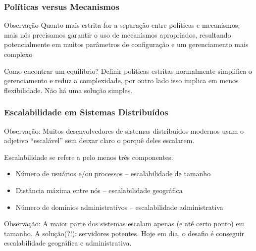 \documentclass[Ligatures=TeX,table,brazil,svgnames,usetotalslideindicator,compress,10pt]{beamer}
\begin{document}
\begin{frame}
  \frametitle{Políticas versus Mecanismos}
  \begin{block}{Observação}
    Quanto mais estrita for a separação entre políticas e mecanismos, mais nós precisamos garantir o uso de mecanismos apropriados, resultando potencialmente em muitos parâmetros de configuração e um gerenciamento mais complexo
  \end{block}
  \begin{block}{Como encontrar um equilíbrio?}
    Definir políticas estritas normalmente simplifica o gerenciamento e reduz a complexidade, por outro lado isso implica em menos flexibilidade. Não há uma solução simples.
  \end{block}
\end{frame}

\begin{frame}
  \frametitle{Escalabilidade em Sistemas Distribuídos}

  \begin{block}{Observação:}
    Muitos desenvolvedores de sistemas distribuídos modernos usam o adjetivo ``escalável'' sem deixar claro o \alert{porquê} deles escalarem.
  \end{block}

  \pause

  \begin{block}{Escalabilidade se refere a pelo menos três componentes:}
    \begin{itemize}
    \item Número de usuários e/ou processos -- \alert{escalabilidade de tamanho}
    \item Distância máxima entre nós -- \alert{escalabilidade geográfica}
    \item Número de domínios administrativos -- \alert{escalabilidade administrativa}
    \end{itemize}
  \end{block}

  \pause

  \begin{alertblock}{Observação:}
    A maior parte dos sistemas escalam apenas (e até certo ponto) em
    tamanho. A solução(?!): servidores potentes. Hoje em dia, o
    desafio é conseguir escalabilidade geográfica e administrativa.
  \end{alertblock}

\end{frame}
\end{document}
